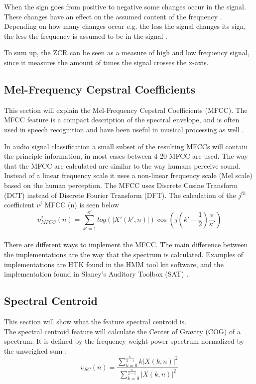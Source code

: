 When the sign goes from positive to negative some changes occur in the signal. These changes have an effect on the assumed content of the frequency \citep{ACA}. Depending on how many changes occur e.g. the less the signal changes its sign, the less the frequency is assumed to be in the signal \citep{ACA}.

To sum up, the ZCR can be seen as a measure of high and low frequency signal, since it measures the amount of times the signal crosses the x-axis.

\subsection{Mel-Frequency Cepstral Coefficients}
This section will explain the Mel-Frequency Cepstral Coefficients (MFCC).
The MFCC feature is a compact description of the spectral envelope, and is often used in speech recognition and have been useful in musical processing as well \citep{ACA}.


In audio signal classification a small subset of the resulting MFCCs will contain the principle information, in most cases between 4-20 MFCC are used. The way that the MFCC are calculated are similar to the way humans perceive sound. Instead of a linear frequency scale it uses a non-linear frequency scale (Mel scale) based on the human perception. The MFCC uses Discrete Cosine Transform (DCT) instead of Discrete Fourier Transform (DFT)\citep{ACA}.
The calculation of the $j^{th}$ coefficient $v^j$  MFCC (n) is seen below \citep{ACA}\\
\begin{equation}\label{ eq:MFCC calculation}
  \upsilon ^j  _{MFCC} (n) = \sum_{k'=1}^{\kappa'} log(\vert X' (k',n) \vert)\cos(j(k' - \frac{1}{2})\frac{\pi}{\kappa'})
\end{equation}
\\
There are different ways to implement the MFCC. The main difference between the implementations are the way that the spectrum is calculated. Examples of implementations are HTK \citep{htkbook} found in the HMM tool kit software,  and the implementation found in Slaney's Auditory Toolbox (SAT) \citep{Slaney}.
\\

\subsection{Spectral Centroid}
This section will show what the feature spectral centroid is.\\
The spectral centroid feature will calculate the Center of Gravity (COG) of a spectrum. It is defined by the frequency weight power spectrum normalized by the unweighed sum \citep{ACA}:
\begin{equation}\label{Spectral Centroid eq}
	\upsilon_{SC}(n) = \frac{\displaystyle\sum_{k = 0}^{\frac{\kappa}{2-1}} k\vert X(k,n) \vert^2}{\displaystyle\sum_{k = 0}^{\frac{\kappa}{2-1}} \vert X(k,n) \vert^2 }    
\end{equation} 


